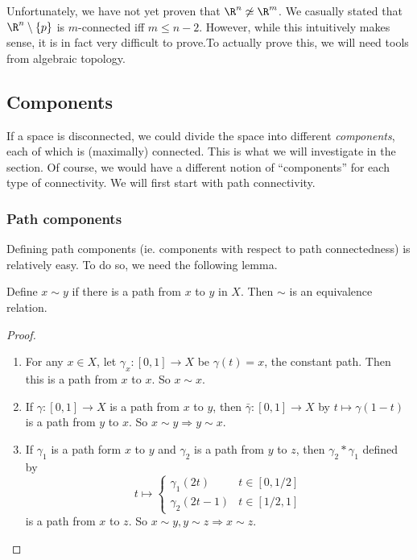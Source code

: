 \documentclass[a4paper]{article}
\begin{document}
Unfortunately, we have not yet proven that $\R^n \not\simeq \R^m$. We casually stated that $\R^n \setminus \{p\}$ is $m$-connected iff $m \leq n - 2$. However, while this intuitively makes sense, it is in fact very difficult to prove.To actually prove this, we will need tools from algebraic topology.

\subsection{Components}
If a space is disconnected, we could divide the space into different \emph{components}, each of which is (maximally) connected. This is what we will investigate in the section. Of course, we would have a different notion of ``components'' for each type of connectivity. We will first start with path connectivity.

\subsubsection{Path components}
Defining path components (ie. components with respect to path connectedness) is relatively easy. To do so, we need the following lemma.

\begin{lemma}
  Define $x\sim y$ if there is a path from $x$ to $y$ in $X$. Then $\sim$ is an equivalence relation.
\end{lemma}

\begin{proof}\leavevmode
  \begin{enumerate}
    \item For any $x\in X$, let $\gamma_x: [0, 1] \to X$ be $\gamma(t) = x$, the constant path. Then this is a path from $x$ to $x$. So $x\sim x$.
    \item If $\gamma: [0, 1] \to X$ is a path from $x$ to $y$, then $\bar \gamma: [0, 1] \to X$ by $t \mapsto \gamma(1 - t)$ is a path from $y$ to $x$. So $x\sim y \Rightarrow y\sim x$.
    \item If $\gamma_1$ is a path form $x$ to $y$ and $\gamma_2$ is a path from $y$ to $z$, then $\gamma_2*\gamma_1$ defined by
      \[
        t\mapsto
        \begin{cases}
          \gamma_1(2t) & t\in [0, 1/2]\\
          \gamma_2(2t - 1) & t\in [1/2, 1]
        \end{cases}
      \]
      is a path from $x$ to $z$. So $x\sim y, y\sim z \Rightarrow x\sim z$.
  \end{enumerate}
\end{proof}
\end{document}

